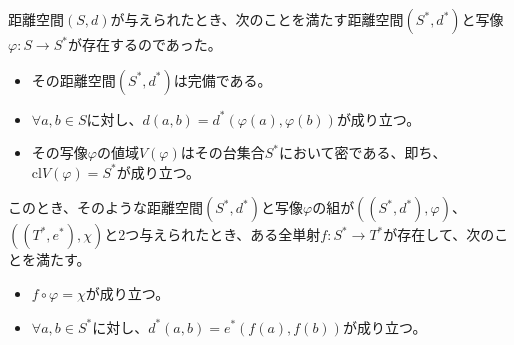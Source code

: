 \documentclass[dvipdfmx]{jsarticle}
\begin{document}
\begin{thm}\label{8.2.6.6}
距離空間$(S,d)$が与えられたとき、次のことを満たす距離空間$\left( S^{*},d^{*} \right)$と写像$\varphi:S \rightarrow S^{*}$が存在するのであった。
\begin{itemize}
\item
  その距離空間$\left( S^{*},d^{*} \right)$は完備である。
\item
  $\forall a,b \in S$に対し、$d(a,b) = d^{*}\left( \varphi(a),\varphi(b) \right)$が成り立つ。
\item
  その写像$\varphi$の値域$V(\varphi)$はその台集合$S^{*}$において密である、即ち、${\mathrm{cl}}{V(\varphi)} = S^{*}$が成り立つ。
\end{itemize}
このとき、そのような距離空間$\left( S^{*},d^{*} \right)$と写像$\varphi$の組が$\left( \left( S^{*},d^{*} \right),\varphi \right)$、$\left( \left( T^{*},e^{*} \right),\chi \right)$と2つ与えられたとき、ある全単射$f:S^{*} \rightarrow T^{*}$が存在して、次のことを満たす。
\begin{itemize}
\item
  $f \circ \varphi = \chi$が成り立つ。
\item
  $\forall a,b \in S^{*}$に対し、$d^{*}(a,b) = e^{*}\left( f(a),f(b) \right)$が成り立つ。
\end{itemize}
\end{thm}
\end{document}
